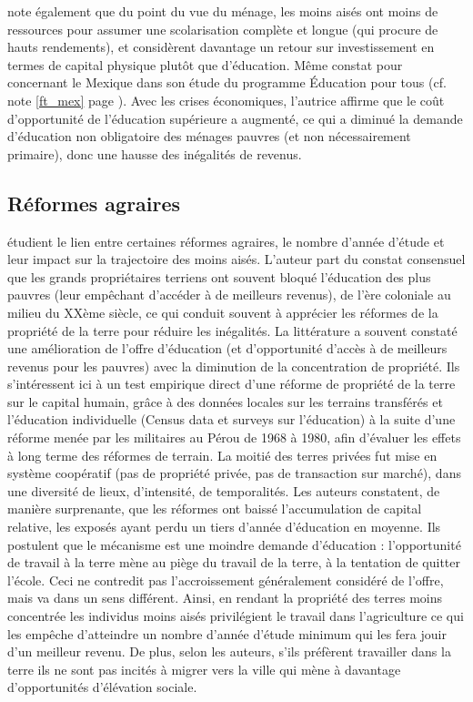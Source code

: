 \documentclass[pagesize, twoside=off, bibliography=totoc, DIV=calc, fontsize=12pt, a4paper, french]{scrartcl}
\begin{document}
 note également que du point du vue du ménage, les moins aisés ont moins de ressources pour assumer une scolarisation complète et longue (qui procure de hauts rendements), et considèrent davantage un retour sur investissement en termes de capital physique plutôt que d’éducation. Même constat pour \citet{urbina} concernant le Mexique dans son étude du programme \og{}Éducation pour tous\fg{} (cf. note \ref{ft_mex} page \pageref{ft_mex}). Avec les crises économiques, l’autrice affirme que le coût d’opportunité de l’éducation supérieure a augmenté, ce qui a diminué la demande d’éducation non obligatoire des ménages pauvres (et non nécessairement primaire), donc une hausse des inégalités de revenus.

\subsection{Réformes agraires}

 étudient le lien entre certaines réformes agraires, le nombre d’année d’étude et leur impact sur la trajectoire des moins aisés. L’auteur part du constat consensuel que les grands propriétaires terriens ont souvent bloqué l’éducation des plus pauvres (leur empêchant d’accéder à de meilleurs revenus), de l’ère coloniale au milieu du XXème siècle, ce qui conduit souvent à apprécier les réformes de la propriété de la terre pour réduire les inégalités. La littérature a souvent constaté une amélioration de l’offre d’éducation (et d’opportunité d’accès à de meilleurs revenus pour les pauvres) avec la diminution de la concentration de propriété. Ils s’intéressent ici à un test empirique direct d’une réforme de propriété de la terre sur le capital humain, grâce à des données locales sur les terrains transférés et l’éducation individuelle (Census data et surveys sur l’éducation) à la suite d’une réforme menée par les militaires au Pérou de 1968 à 1980, afin d’évaluer les effets à long terme des réformes de terrain. La moitié des terres privées fut mise en système coopératif (pas de propriété privée, pas de transaction sur marché), dans une diversité de lieux, d’intensité, de temporalités. Les auteurs constatent, de manière surprenante, que les réformes ont baissé l’accumulation de capital relative, les exposés ayant perdu un tiers d’année d’éducation en moyenne. Ils postulent que le mécanisme est une moindre demande d’éducation : l’opportunité de travail à la terre mène au piège du travail de la terre, à la tentation de quitter l’école. Ceci ne contredit pas l’accroissement généralement considéré de l’offre, mais va dans un sens différent. Ainsi, en rendant la propriété des terres moins concentrée les individus moins aisés privilégient le travail dans l’agriculture ce qui les empêche d’atteindre un nombre d’année d’étude minimum qui les fera jouir d’un meilleur revenu. De plus, selon les auteurs, s’ils préfèrent travailler dans la terre ils ne sont pas incités à migrer vers la ville qui mène à davantage d’opportunités d’élévation sociale.
\end{document}
